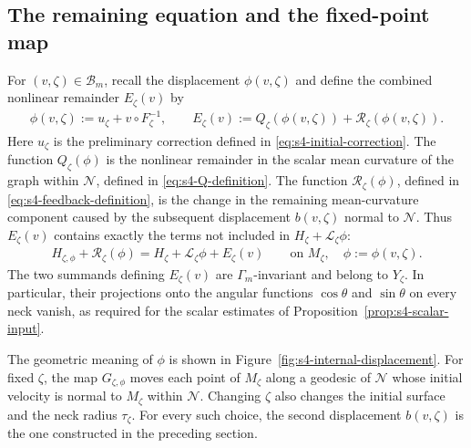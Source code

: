 \documentclass[a4paper,11pt,oneside,reqno]{amsart}
\numberwithin{equation}{section}
\theoremstyle{definition}
\begin{document}
\subsection{The remaining equation and the fixed-point map}

For $(v,\zeta)\in\mathcal B_m$, recall the displacement
$\phi(v,\zeta)$ and define the combined nonlinear remainder
$E_\zeta(v)$ by
%
\begin{align}
    \label{eq:s4-coupled-source}
    \phi(v,\zeta):=u_\zeta+v\circ F_\zeta^{-1},\qquad
    E_\zeta(v):=Q_\zeta(\phi(v,\zeta))
    +\mathcal R_\zeta(\phi(v,\zeta)).
\end{align}
%
Here $u_\zeta$ is the preliminary correction defined in
\eqref{eq:s4-initial-correction}. The function $Q_\zeta(\phi)$ is
the nonlinear remainder in the scalar mean curvature of the graph
within $\mathcal N$, defined in \eqref{eq:s4-Q-definition}.
The function $\mathcal R_\zeta(\phi)$, defined in
\eqref{eq:s4-feedback-definition}, is the change in the remaining
mean-curvature component caused by the subsequent displacement
$b(v,\zeta)$ normal to $\mathcal N$. Thus $E_\zeta(v)$ contains
exactly the terms not included in
$H_\zeta+\mathcal L_\zeta\phi$:
%
\begin{align*}
    H_{\zeta,\phi}+\mathcal R_\zeta(\phi)
    =H_\zeta+\mathcal L_\zeta\phi+E_\zeta(v)
    \qquad\text{on }M_\zeta,
    \quad \phi:=\phi(v,\zeta).
\end{align*}
%
The two summands defining $E_\zeta(v)$ are
$\Gamma_m$-invariant and belong to $Y_\zeta$.
In particular, their projections onto the angular functions
$\cos\theta$ and $\sin\theta$ on every neck vanish, as required
for the scalar estimates of
Proposition~\ref{prop:s4-scalar-input}.

The geometric meaning of $\phi$ is shown in
Figure~\ref{fig:s4-internal-displacement}. For fixed $\zeta$,
the map $G_{\zeta,\phi}$ moves each point of $M_\zeta$ along a
geodesic of $\mathcal N$ whose initial velocity is normal to
$M_\zeta$ within $\mathcal N$. Changing $\zeta$ also changes
the initial surface and the neck radius $\tau_\zeta$.
For every such choice, the second displacement $b(v,\zeta)$
is the one constructed in the preceding section.
\end{document}
